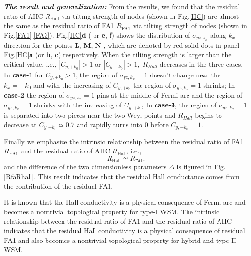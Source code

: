 \documentclass[twocolumn,superscriptaddress]{revtex4}%
\begin{document}
\textbf{\emph{The result and generalization:}} From the results, we found that the residual ratio
of AHC $R_{\mathrm{Hall}}$ via tilting strength of nodes (shown in
Fig.\ref{HC}) are almost the same as the residual ratio of FA1
$R_{\mathrm{FA1}}$ via tilting strength of nodes (shown in Fig.\ref{FA1}-\ref{FA3}). Fig.\ref{HC}\textbf{d} ( or \textbf{e}, \textbf{f}) shows the distribution of
$\sigma_{yz,k_{x}}$ along $k_{x}$-direction for the points $\mathbf{L}$,
$\mathbf{M}$, $\mathbf{N}$ , which are denoted by
red solid dots in panel Fig.\ref{HC}\textbf{a} (or \textbf{b}, \textbf{c}) respectively. When the tilting strength is larger than the critical
value, i.e., $|C_{y,+k_{0}}|>1$ or $|C_{y,-k_{0}}|>1,$ $R_{Hall}$ decreases in
the three cases. In \textbf{case-1} for $C_{y,+k_{0}}>1$, the region of
$\sigma_{yz,k_{x}}=1$ doesn't change near the $k_{x}=-k_{0}$ and with the
increasing of $C_{y,+k_{0}}$ the region of $\sigma_{yz,k_{x}}=1$ shrinks; In
\textbf{case-2} the region of $\sigma_{yz,k_{x}}=1$ pins at the middle of
Fermi arc and the region of $\sigma_{yz,k_{x}}=1$ shrinks with the increasing
of $C_{y,+k_{0}}$; In \textbf{case-3}, the region of $\sigma_{yz,k_{x}}=1$ is
separated into two pieces near the two Weyl points and $R_{Hall}$ begins
to decrease at $C_{y,+k_{0}}\simeq0.7$ and rapidly turns into $0$ before
$C_{y,+k_{0}}=1$. 

Finally we emphasize the intrinsic relationship between the residual ratio of
FA1 $R_{\mathrm{FA1}}$ and the residual ratio of AHC
$R_{\mathrm{Hall}}$, i.e.,
\begin{equation}
R_{\mathrm{Hall}}\simeq R_{\mathtt{FA1}}.\label{eq}%
\end{equation}
and the difference of the two dimensionless parameters $\Delta$ is figured in
Fig.\ref{RfaRhall}. This result indicates that the residual Hall conductance
comes from the contribution of the residual FA1.

It is known that the Hall conductivity is a physical consequence of Fermi arc
and becomes a nontrivial topological property for type-I WSM. The intrinsic
relationship between the residual ratio of FA1 and the residual ratio of AHC
indicates that the residual Hall conductivity is a physical consequence of
residual FA1 and also becomes a nontrivial topological property for hybrid and
type-II WSM.
\end{document}
